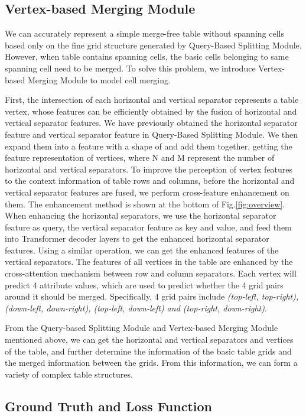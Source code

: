 \documentclass[lettersize,journal]{IEEEtran}
\begin{document}
\subsection{Vertex-based Merging Module}
We can accurately represent a simple merge-free table without spanning cells based only on the fine grid structure generated by Query-Based Splitting Module. However, when table contains spanning cells, the basic cells belonging to same spanning cell need to be merged. To solve this problem, we introduce Vertex-based Merging Module to model cell merging. 

First, the intersection of each horizontal and vertical separator represents a table vertex, whose features can be efficiently obtained by the fusion of horizontal and vertical separator features. We have previously obtained the horizontal separator feature  and vertical separator feature  in Query-Based Splitting Module. We then expand them into a feature with a shape of  and add them together, getting the feature representation of  vertices, where N and M represent the number of horizontal and vertical separators. To improve the perception of vertex features to the context information of table rows and columns, before the horizontal and vertical separator features are fused, we perform cross-feature enhancement on them. The enhancement method is shown at the bottom of Fig.\ref{fig:overview}. When enhancing the horizontal separators, we use the horizontal separator feature  as query, the vertical separator feature  as key and value, and feed them into Transformer decoder layers to get the enhanced horizontal separator features. Using a similar operation, we can get the enhanced features of the vertical separators. The features of all vertices in the table are enhanced by the cross-attention mechanism between row and column separators. Each vertex will predict 4 attribute values, which are used to predict whether the 4 grid pairs around it should be merged. Specifically, 4 grid pairs include \emph{(top-left, top-right), (down-left, down-right), (top-left, down-left) and (top-right, down-right)}.

From the Query-based Splitting Module and Vertex-based Merging Module mentioned above, we can get the horizontal and vertical separators and vertices of the table, and further determine the information of the basic table grids and the merged information between the grids. From this information, we can form a variety of complex table structures.

\subsection{Ground Truth and Loss Function} 
\end{document}
